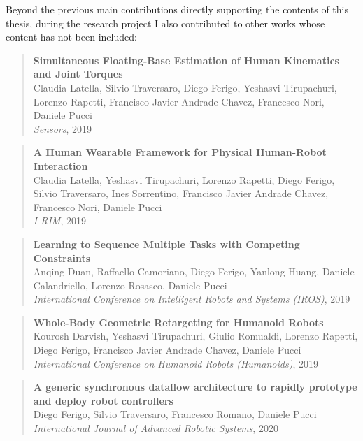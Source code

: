 \noindent
Beyond the previous main contributions directly supporting the contents of this thesis, during the research project I also contributed to other works whose content has not been included:

\begin{quote}
    \textbf{Simultaneous Floating-Base Estimation of Human Kinematics and Joint Torques} \\
     Claudia Latella, Silvio Traversaro, Diego Ferigo, Yeshasvi Tirupachuri, Lorenzo Rapetti, Francisco Javier Andrade Chavez, Francesco Nori, Daniele Pucci \\
    \textit{Sensors}, 2019
\end{quote}

\begin{quote}
    \textbf{A Human Wearable Framework for Physical Human-Robot Interaction} \\
     Claudia Latella, Yeshasvi Tirupachuri, Lorenzo Rapetti, Diego Ferigo, Silvio Traversaro, Ines Sorrentino, Francisco Javier Andrade Chavez, Francesco Nori, Daniele Pucci \\
    \textit{I-RIM}, 2019
\end{quote}

\begin{quote}
    \textbf{Learning to Sequence Multiple Tasks with Competing Constraints} \\
     Anqing Duan, Raffaello Camoriano, Diego Ferigo, Yanlong Huang, Daniele Calandriello, Lorenzo Rosasco, Daniele Pucci \\
    \textit{International Conference on Intelligent Robots and
Systems (IROS)}, 2019
\end{quote}

\begin{quote}
    \textbf{Whole-Body Geometric Retargeting for Humanoid Robots} \\
    Kourosh Darvish, Yeshasvi Tirupachuri, Giulio Romualdi, Lorenzo Rapetti, Diego Ferigo, Francisco Javier Andrade Chavez, Daniele Pucci \\
    \textit{International
Conference on Humanoid Robots (Humanoids)}, 2019
\end{quote}

\begin{quote}
    \textbf{A generic synchronous dataflow architecture to rapidly prototype and deploy robot controllers} \\
    Diego Ferigo, Silvio Traversaro, Francesco Romano, Daniele Pucci \\
    \textit{International Journal of Advanced Robotic Systems}, 2020
\end{quote}


